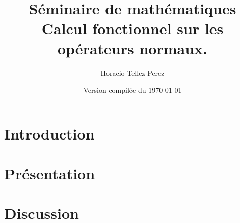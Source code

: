 \documentclass[a4paper, 11pt]{report}
\title{Séminaire de mathématiques \\ Calcul fonctionnel sur les opérateurs
normaux.}
\author{Horacio Tellez Perez}
\date{Version compilée du \today}
\begin{document}
\maketitle

\tableofcontents

\chapter*{Introduction}

\chapter{Présentation}

\chapter{Discussion}
\end{document}
